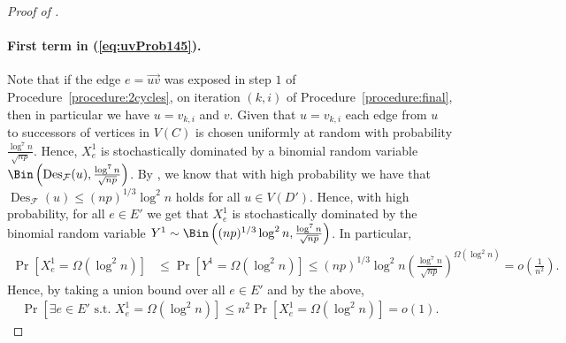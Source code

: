\documentclass{article}
\DeclareMathOperator{\Des}{Des}
\begin{document}
\begin{proof}[Proof of ]
		\paragraph*{First term in (\ref{eq:uvProb145}).}
		Note that if the edge $e = \overrightarrow{uv}$ was exposed in step $1$ of Procedure~\ref{procedure:2cycles}, on iteration $(k,i)$ of Procedure~\ref{procedure:final}, then in particular we have $u = v_{k,i}$ and $v$.
		Given that $u = v_{k,i}$ each edge from $u$ to successors of vertices in $V(C)$ is chosen uniformly at random with probability $\frac{\log^7 n}{\sqrt{np}}$.
		Hence, $X^1_e$ is stochastically dominated by a binomial random variable $\Bin\left(\Des_{\mathcal F}(u), \frac{\log^7 n}{\sqrt{np}} \right)$.
		By , we know that with high probability we have that $\Des_{\mathcal F}(u) \le (np)^{1/3}\log^2 n$ holds for all $u \in V(D')$.
		Hence, with high probability, for all $e \in E'$ we get that $X^1_e$ is stochastically dominated by the binomial random variable $Y^1 \sim \Bin\left((np)^{1/3}\log^2 n, \frac{\log^7 n}{\sqrt{np}} \right)$.
		In particular,
		\begin{align*}
		\Pr\left[X^1_e = \Omega(\log^2 n) \right] &\le \Pr\left[Y^1 = \Omega(\log^2 n) \right] \le (np)^{1/3}\log^2 n \left(\tfrac{\log^7 n}{\sqrt{np}} \right)^{\Omega(\log^2 n)} = o\left(\tfrac{1}{n^2} \right).
		\end{align*}
		Hence, by taking a union bound over all $e \in E'$ and by the above,
		\begin{align*}
		\Pr\left[\exists e\in E' \text{ s.t. } X^1_e = \Omega(\log^2 n) \right] \le n^2 \Pr\left[X^1_e = \Omega(\log^2 n) \right] = o(1).
		\end{align*}
		
		

\end{proof}
\end{document}
